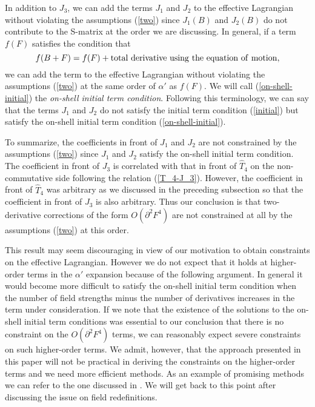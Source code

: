 \documentclass[a4paper,12pt]{article}
\begin{document}
In addition to $J_3$, we can add the terms $J_1$ and $J_2$
to the effective Lagrangian
without violating the assumptions (\ref{two})
since $J_1 (B)$ and $J_2 (B)$ do not contribute to the S-matrix
at the order we are discussing.
In general, if a term $f(F)$ satisfies the condition that
\begin{equation}
f(B+F) = f(F) + {\rm total~derivative~using~the~equation~of~motion},
\label{on-shell-initial}
\end{equation}
we can add the term to the effective Lagrangian
without violating the assumptions (\ref{two}) at the same order
of $\alpha'$ as $f(F)$.
We will call (\ref{on-shell-initial})
the {\it on-shell initial term condition}.
Following this terminology, we can say that
the terms $J_1$ and $J_2$ do not satisfy the initial term condition
(\ref{initial}) but satisfy the on-shell initial term condition
(\ref{on-shell-initial}).

To summarize, the coefficients in front of $J_1$ and $J_2$
are not constrained by the assumptions (\ref{two})
since $J_1$ and $J_2$ satisfy the on-shell initial term condition.
The coefficient in front of $J_3$ is correlated with that in front of
$\hat{T}_4$ on the non-commutative side
following the relation (\ref{T_4-J_3}).
However, the coefficient in front of $\hat{T}_4$ was arbitrary
as we discussed in the preceding subsection so that
the coefficient in front of $J_3$ is also arbitrary.
Thus our conclusion is that two-derivative corrections of the form
$O(\partial^2 F^4)$ are not constrained at all
by the assumptions (\ref{two}) at this order.

This result may seem discouraging in view of our motivation
to obtain constraints on the effective Lagrangian.
However we do not expect that it holds at higher-order terms
in the $\alpha'$ expansion because of the following argument.
In general it would become more difficult
to satisfy the on-shell initial term condition
when the number of field strengths minus
the number of derivatives increases
in the term under consideration.
If we note that the existence of the solutions
to the on-shell initial term conditions was
essential to our conclusion that there is no constraint
on the $O(\partial^2 F^4)$ terms,
we can reasonably expect severe constraints
on such higher-order terms.
We admit, however, that the approach presented in this paper
will not be practical in deriving the constraints
on the higher-order terms
and we need more efficient methods.
As an example of promising methods
we can refer to the one discussed in \cite{Terashima}.
We will get back to this point after discussing the issue
on field redefinitions.
\end{document}
